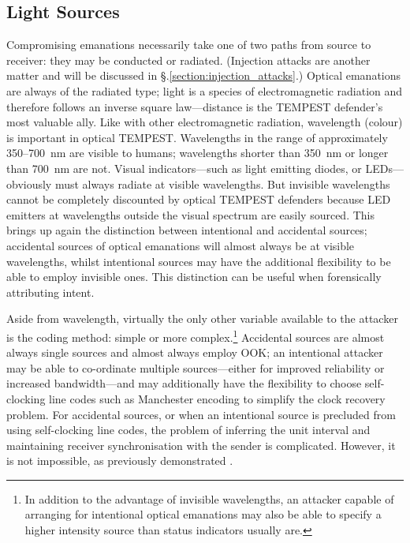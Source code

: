 \documentclass[a4paper,twoside,11pt,openany]{book}
\begin{document}
\subsection{Light Sources}
Compromising emanations necessarily take one of two paths from source to
receiver: they may be conducted or
radiated. (Injection attacks are another matter and will be discussed in
\S \thechapter.\ref{section:injection_attacks}.) Optical emanations are always
of the radiated type; light is a species of electromagnetic radiation and
therefore follows an inverse square law---distance is the TEMPEST defender's
most valuable ally. Like with other electromagnetic radiation, wavelength
(colour) is important in optical TEMPEST. Wavelengths in the range of
approximately 350--\SI{700}{\nano\metre} are visible to
humans; wavelengths shorter than \SI{350}{\nano\metre} or longer than
\SI{700}{\nano\metre} are not. Visual indicators---such as light emitting
diodes, or LEDs---obviously must always radiate at visible wavelengths. But
invisible wavelengths cannot be completely discounted by optical TEMPEST
defenders because LED emitters at wavelengths outside the visual spectrum are
easily sourced. This brings up again the distinction between intentional and
accidental sources; accidental sources of optical emanations will almost always
be at visible wavelengths, whilst intentional sources may have the additional
flexibility to be able to employ invisible ones. This distinction can be useful
when forensically attributing intent.

Aside from wavelength, virtually the only other variable available to the
attacker is the coding method: simple or more complex.\footnote{In addition to
the advantage of invisible wavelengths, an attacker capable of arranging for
intentional optical emanations may also be able to specify a higher intensity
source than status indicators usually are.} Accidental sources are almost
always single sources and almost always employ OOK; an intentional attacker may
be able to co-ordinate multiple sources---either for improved reliability or
increased bandwidth---and may additionally have the flexibility to choose
self-clocking line codes such as Manchester encoding to simplify the clock
recovery problem. For accidental sources, or when an intentional source is
precluded from using self-clocking line codes, the problem of inferring the
unit interval and maintaining receiver synchronisation with the sender is
complicated. However, it is not impossible, as previously demonstrated
\cite[\S 8.2]{Loughry2002a}.
\end{document}
